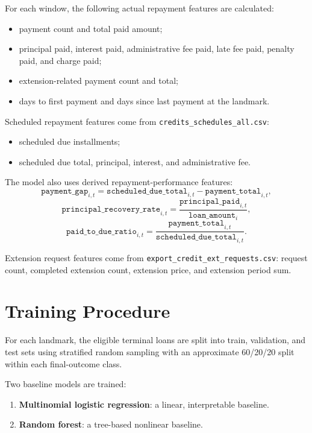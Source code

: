 \documentclass[11pt]{article}
\begin{document}
For each window, the following actual repayment features are calculated:

\begin{itemize}
    \item payment count and total paid amount;
    \item principal paid, interest paid, administrative fee paid, late fee paid, penalty paid, and charge paid;
    \item extension-related payment count and total;
    \item days to first payment and days since last payment at the landmark.
\end{itemize}

Scheduled repayment features come from \texttt{credits\_schedules\_all.csv}:

\begin{itemize}
    \item scheduled due installments;
    \item scheduled due total, principal, interest, and administrative fee.
\end{itemize}

The model also uses derived repayment-performance features:
\[
\texttt{payment\_gap}_{i,t} = \texttt{scheduled\_due\_total}_{i,t} - \texttt{payment\_total}_{i,t},
\]
\[
\texttt{principal\_recovery\_rate}_{i,t}
= \frac{\texttt{principal\_paid}_{i,t}}{\texttt{loan\_amount}_{i}},
\]
\[
\texttt{paid\_to\_due\_ratio}_{i,t}
= \frac{\texttt{payment\_total}_{i,t}}{\texttt{scheduled\_due\_total}_{i,t}}.
\]

Extension request features come from \texttt{export\_credit\_ext\_requests.csv}: request count, completed extension count, extension price, and extension period sum.

\section{Training Procedure}

For each landmark, the eligible terminal loans are split into train, validation, and test sets using stratified random sampling with an approximate 60/20/20 split within each final-outcome class.

Two baseline models are trained:

\begin{enumerate}
    \item \textbf{Multinomial logistic regression}: a linear, interpretable baseline.
    \item \textbf{Random forest}: a tree-based nonlinear baseline.
\end{enumerate}
\end{document}
